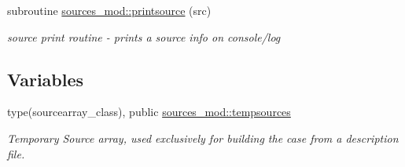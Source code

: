 \begin{DoxyCompactItemize}
subroutine \mbox{\hyperlink{namespacesources__mod_a641fe9ecc295e486a714c1aaa133d991}{sources\+\_\+mod\+::printsource}} (src)
\begin{DoxyCompactList}\small\item\em source print routine -\/ prints a source info on console/log \end{DoxyCompactList}\end{DoxyCompactItemize}
\subsection*{Variables}
\begin{DoxyCompactItemize}
\item 
type(sourcearray\+\_\+class), public \mbox{\hyperlink{namespacesources__mod_adafecf0cf9ade0b7a85421a5801a920e}{sources\+\_\+mod\+::tempsources}}
\begin{DoxyCompactList}\small\item\em Temporary Source array, used exclusively for building the case from a description file. \end{DoxyCompactList}\end{DoxyCompactItemize}
